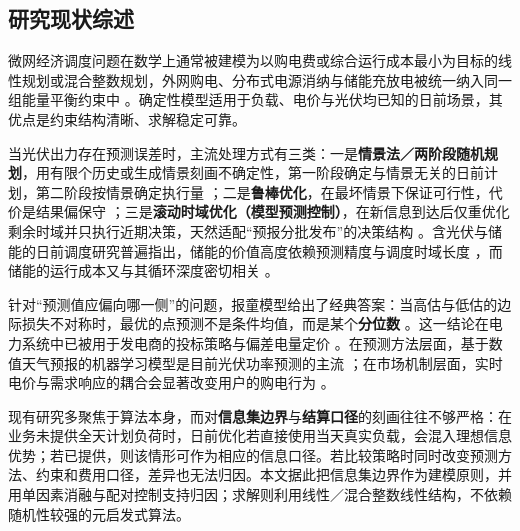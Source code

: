 \subsection{研究现状综述}

微网经济调度问题在数学上通常被建模为以购电费或综合运行成本最小为目标的线性规划或混合整数规划，外网购电、分布式电源消纳与储能充放电被统一纳入同一组能量平衡约束中 \cite{wu2014dynamic,nemati2018optimization}。确定性模型适用于负载、电价与光伏均已知的日前场景，其优点是约束结构清晰、求解稳定可靠。

当光伏出力存在预测误差时，主流处理方式有三类：一是\textbf{情景法／两阶段随机规划}，用有限个历史或生成情景刻画不确定性，第一阶段确定与情景无关的日前计划，第二阶段按情景确定执行量 \cite{wu2016solution,sun2025distributionally}；二是\textbf{鲁棒优化}，在最坏情景下保证可行性，代价是结果偏保守 \cite{zhang2018robust}；三是\textbf{滚动时域优化（模型预测控制）}，在新信息到达后仅重优化剩余时域并只执行近期决策，天然适配“预报分批发布”的决策结构 \cite{elkazaz2020energy,silva2020optimal}。含光伏与储能的日前调度研究普遍指出，储能的价值高度依赖预测精度与调度时域长度 \cite{luo2020optimal}，而储能的运行成本又与其循环深度密切相关 \cite{maheshwari2020optimizing}。

针对“预测值应偏向哪一侧”的问题，报童模型给出了经典答案：当高估与低估的边际损失不对称时，最优的点预测不是条件均值，而是某个\textbf{分位数} \cite{qin2011newsvendor}。这一结论在电力系统中已被用于发电商的投标策略与偏差电量定价 \cite{polat2024renewable}。在预测方法层面，基于数值天气预报的机器学习模型是目前光伏功率预测的主流 \cite{markovics2022comparison}；在市场机制层面，实时电价与需求响应的耦合会显著改变用户的购电行为 \cite{wang2015review}。

现有研究多聚焦于算法本身，而对\textbf{信息集边界}与\textbf{结算口径}的刻画往往不够严格：在业务未提供全天计划负荷时，日前优化若直接使用当天真实负载，会混入理想信息优势；若已提供，则该情形可作为相应的信息口径。若比较策略时同时改变预测方法、约束和费用口径，差异也无法归因。本文据此把信息集边界作为建模原则，并用单因素消融与配对控制支持归因；求解则利用线性／混合整数线性结构，不依赖随机性较强的元启发式算法。

